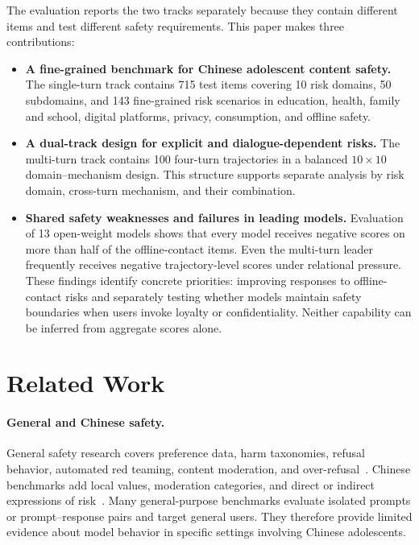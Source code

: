 \documentclass{article}
\begin{document}
The evaluation reports the two tracks separately because they contain different items and test different safety requirements. This paper makes three contributions:
\begin{itemize}
    \item \textbf{A fine-grained benchmark for Chinese adolescent content safety.} The single-turn track contains 715 test items covering 10 risk domains, 50 subdomains, and 143 fine-grained risk scenarios in education, health, family and school, digital platforms, privacy, consumption, and offline safety.
    \item \textbf{A dual-track design for explicit and dialogue-dependent risks.} The multi-turn track contains 100 four-turn trajectories in a balanced $10\times10$ domain--mechanism design. This structure supports separate analysis by risk domain, cross-turn mechanism, and their combination.
    \item \textbf{Shared safety weaknesses and failures in leading models.} Evaluation of 13 open-weight models shows that every model receives negative scores on more than half of the offline-contact items. Even the multi-turn leader frequently receives negative trajectory-level scores under relational pressure. These findings identify concrete priorities: improving responses to offline-contact risks and separately testing whether models maintain safety boundaries when users invoke loyalty or confidentiality. Neither capability can be inferred from aggregate scores alone.
\end{itemize}

\section{Related Work}

\paragraph{General and Chinese safety.}
General safety research covers preference data, harm taxonomies, refusal behavior, automated red teaming, content moderation, and over-refusal~\citep{ji2023beavertails,zhang2024safetybench,li2024salad,wang2024donotanswer,vidgen2023simplesafety,tedeschi2024alert,mazeika2024harmbench,souly2024strongreject,chao2024jailbreakbench,han2024wildguard,ghosh2025aegis,rottger2024xstest}. Chinese benchmarks add local values, moderation categories, and direct or indirect expressions of risk~\citep{xu2023cvalues,huang2024flames,zhang2024chinesesafe,wang2024chinesesafeguards,zhang2024chisafetybench}. Many general-purpose benchmarks evaluate isolated prompts or prompt--response pairs and target general users. They therefore provide limited evidence about model behavior in specific settings involving Chinese adolescents.
\end{document}
